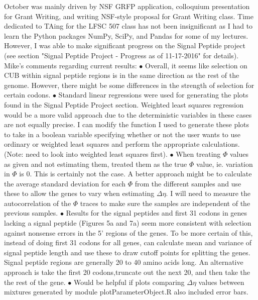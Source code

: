 \documentclass[11pt]{labbook}
\begin{document}
October was mainly driven by NSF GRFP application, colloquium presentation for Grant Writing, and writing NSF-style proposal for Grant Writing class. Time dedicated to TAing for the LFSC 507 class has not been insignificant as I had to learn the Python packages NumPy, SciPy, and Pandas for some of my lectures. 
\newline
However, I was able to make significant progress on the Signal Peptide project (see section "Signal Peptide Project - Progress as of 11-17-2016" for details).
\newline \newline
Mike's comments regarding current results: \newline
$\bullet$ Overall, it seems like selection on CUB within signal peptide regions is in the same direction as the rest of the genome. However, there might be some differences in the strength of selection for certain codons. \newline \newline
$\bullet$ Standard linear regressions were used for generating the plots found in the Signal Peptide Project section. Weighted least squares regression would be a more valid approach due to the deterministic variables in these cases are not equally precise. I can modify the function I used to generate these plots to take in a boolean variable specifying whether or not the user wants to use ordinary or weighted least squares and perform the appropriate calculations. (Note: need to look into weighted least squares first). \newline \newline
$\bullet$ When treating $\Phi$ values as given and not estimating them, treated them as the true $\Phi$ value, ie. variation in $\Phi$ is 0. This is certainly not the case. A better approach might be to calculate the average standard deviation for each $\Phi$ from the different samples and use these to allow the genes to vary when estimating $\Delta\eta$. I will need to measure the autocorrelation of the $\Phi$ traces to make sure the samples are independent of the previous samples. \newline \newline
$\bullet$ Results for the signal peptides and first 31 codons in genes lacking a signal peptide (Figures 5a and 7a) seem more consistent with selection against nonsense errors in the 5' regions of the genes. To be more certain of this, instead of doing first 31 codons for all genes, can calculate mean and variance of signal peptide length and use these to draw cutoff points for splitting the genes. Signal peptide regions are generally 20 to 40 amino acids long. An alternative approach is take the first 20 codons,truncate out the next 20, and then take the the rest of the gene. \newline \newline
$\bullet$ Would be helpful if plots comparing $\Delta\eta$ values between mixtures generated by module plotParameterObject.R also included error bars. \newline \newline
\end{document}
